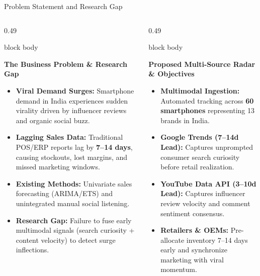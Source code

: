 \documentclass[aspectratio=169, 10pt]{beamer}
\newenvironment{card}[1][]{%
    \begin{beamercolorbox}[rounded=true,shadow=false,wd=\linewidth,sep=4pt,#1]{block body}%
}{%
    \end{beamercolorbox}%
}
\begin{document}
\begin{frame}{Problem Statement and Research Gap}
    \begin{columns}[T]
        \begin{column}{0.49\textwidth}
            \begin{card}
                {\fontsize{8.5pt}{10pt}\selectfont \textbf{\color{NavyPrimary}The Business Problem \& Research Gap}}\\[0.08cm]
                \begin{itemize}\setlength{\itemsep}{2pt}
                    \item \textbf{Viral Demand Surges:} Smartphone demand in India experiences sudden virality driven by influencer reviews and organic social buzz.
                    \item \textbf{Lagging Sales Data:} Traditional POS/ERP reports lag by \textbf{7--14 days}, causing stockouts, lost margins, and missed marketing windows.
                    \item \textbf{Existing Methods:} Univariate sales forecasting (ARIMA/ETS) and unintegrated manual social listening.
                    \item \textbf{Research Gap:} Failure to fuse early multimodal signals (search curiosity + content velocity) to detect surge inflections.
                \end{itemize}
            \end{card}
        \end{column}

        \begin{column}{0.49\textwidth}
            \begin{card}
                {\fontsize{8.5pt}{10pt}\selectfont \textbf{\color{BlueAccent}Proposed Multi-Source Radar \& Objectives}}\\[0.08cm]
                \begin{itemize}\setlength{\itemsep}{2pt}
                    \item \textbf{Multimodal Ingestion:} Automated tracking across \textbf{60 smartphones} representing 13 brands in India.
                    \item \textbf{Google Trends (7--14d Lead):} Captures unprompted consumer search curiosity before retail realization.
                    \item \textbf{YouTube Data API (3--10d Lead):} Captures influencer review velocity and comment sentiment consensus.
                    \item \textbf{Retailers \& OEMs:} Pre-allocate inventory 7--14 days early and synchronize marketing with viral momentum.
                \end{itemize}
            \end{card}
        \end{column}
    \end{columns}
\end{frame}
\end{document}
